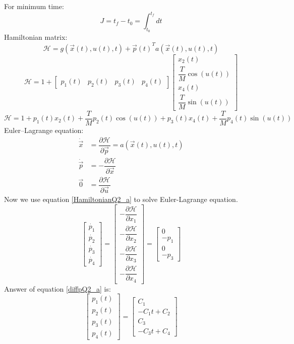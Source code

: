 For minimum time:
$$J = t_f - t_0 = \int_{t_0}^{t_f} dt$$
Hamiltonian matrix:
$$\mathcal{H} =  g(\vec x(t), u(t), t) + {\vec{p}(t)}^Ta(\vec x(t), u(t), t)$$
$$\mathcal{H} = 1 + \begin{bmatrix} 
	p_1(t) & p_2(t) & p_3(t) & p_4(t)
\end{bmatrix} \begin{bmatrix}
	x_2(t)\\
	\dfrac{T}{M} \cos(u(t))\\
	x_4(t)\\
	\dfrac{T}{M} \sin(u(t))
\end{bmatrix}$$
\begin{equation} \label{HamiltonianQ2_a}
	\mathcal{H} = 1 + p_1(t)x_2(t) + \dfrac{T}{M}p_2(t)\cos(u(t)) +p_3(t)x_4(t) +\dfrac{T}{M}p_4(t)\sin(u(t))
\end{equation}
Euler–Lagrange equation:
\begin{align}
	\dot{\vec{x}} &= \dfrac{\partial \mathcal{H} }{\partial \vec{p}} = a(\vec x(t), u(t), t)\\
	\dot{\vec{p}} &= -\dfrac{\partial \mathcal{H} }{\partial \vec{x}} \\
	{\vec{0}} &= \dfrac{\partial \mathcal{H} }{\partial \vec{u}}
\end{align}
Now  we use equation \ref{HamiltonianQ2_a} to solve Euler-Lagrange equation.
\begin{equation}\label{diffpQ2_a}
	\begin{bmatrix}
		\dot{p_1}\\
		\dot{p_2}\\
		\dot{p_3}\\
		\dot{p_4}
	\end{bmatrix} = \begin{bmatrix}
		-\dfrac{\partial \mathcal{H}}{\partial x_1} \\[10 pt]
		-\dfrac{\partial \mathcal{H}}{\partial x_2} \\[10 pt]
		-\dfrac{\partial \mathcal{H}}{\partial x_3} \\[10 pt]
		-\dfrac{\partial \mathcal{H}}{\partial x_4} 
	\end{bmatrix} = \begin{bmatrix}
		0 \\
		-p_1\\
		0\\
		-p_3
	\end{bmatrix}
\end{equation} 
Answer of equation \ref{diffpQ2_a} is:
\begin{equation}\label{SolvepQ2_a}
	\begin{bmatrix}
		p_1(t)\\
		p_2(t)\\
		p_3(t)\\
		p_4(t)
	\end{bmatrix} = \begin{bmatrix}
		C_1\\
		-C_1t+C_2\\
		C_3\\
		-C_3t+C_4
	\end{bmatrix} 
\end{equation}
